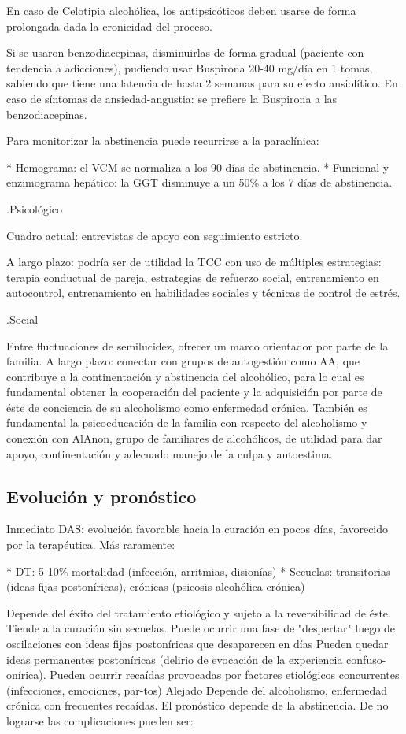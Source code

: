 En caso de Celotipia alcohólica, los antipsicóticos deben usarse de forma prolongada dada la cronicidad del proceso.

Si se usaron benzodiacepinas, disminuirlas de forma gradual (paciente con tendencia a adicciones), pudiendo usar Buspirona 20-40 mg/día en 1 tomas, sabiendo que tiene una latencia de hasta 2 semanas para su efecto ansiolítico. En caso de síntomas de ansiedad-angustia: se prefiere la Buspirona a las benzodiacepinas.

Para monitorizar la abstinencia puede recurrirse a la paraclínica:

* Hemograma: el VCM se normaliza a los 90 días de abstinencia.
* Funcional y enzimograma hepático: la GGT disminuye a un 50\% a los 7 días de abstinencia.

.Psicológico

Cuadro actual: entrevistas de apoyo con seguimiento estricto.

A largo plazo: podría ser de utilidad la TCC con uso de múltiples estrategias: terapia conductual de pareja, estrategias de refuerzo social, entrenamiento en autocontrol, entrenamiento en habilidades sociales y técnicas de control de estrés.

.Social

Entre fluctuaciones de semilucidez, ofrecer un marco orientador por parte de la familia. A largo plazo: conectar con grupos de autogestión como AA, que contribuye a la continentación y abstinencia del alcohólico, para lo cual es fundamental obtener la cooperación del paciente y la adquisición por parte de éste de conciencia de su alcoholismo como enfermedad crónica. También es fundamental la psicoeducación de la familia con respecto del alcoholismo y conexión con AlAnon, grupo de familiares de alcohólicos, de utilidad para dar apoyo, continentación y adecuado manejo de la culpa y autoestima.

\subsection*{Evolución y pronóstico}

Inmediato DAS: evolución favorable hacia la curación en pocos días, favorecido por la terapéutica. Más raramente:

* DT: 5-10\% mortalidad (infección, arritmias, disionías)
* Secuelas: transitorias (ideas fijas postoníricas), crónicas (psicosis alcohólica crónica)

Depende del éxito del tratamiento etiológico y sujeto a la reversibilidad de éste. Tiende a la curación sin secuelas. Puede ocurrir una fase de "despertar" luego de oscilaciones con ideas fijas postoníricas que desaparecen en días Pueden quedar ideas permanentes postoníricas (delirio de evocación de la experiencia confuso-onírica). Pueden ocurrir recaídas provocadas por factores etiológicos concurrentes (infecciones, emociones, par-tos) Alejado Depende del alcoholismo, enfermedad crónica con frecuentes recaídas. El pronóstico depende de la abstinencia. De no lograrse las complicaciones pueden ser:

